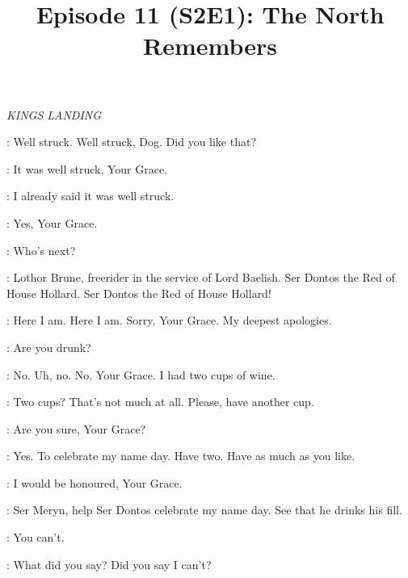 

\title{Episode 11 (S2E1): The North Remembers}
\author{}
\date{}
\maketitle




\scene

\textit{KINGS LANDING}


\JOFFREY: Well struck. Well struck, Dog.  Did you like that?

\SANSA: It was well struck, Your Grace.

\JOFFREY: I already said it was well struck.

\SANSA: Yes, Your Grace.

\JOFFREY: Who's next?

\HERALD: Lothor Brune, freerider in the service of Lord Baelish.  Ser Dontos the Red of House Hollard.  Ser Dontos the Red of House Hollard!


\DONTOS: Here I am. Here I am. Sorry, Your Grace. My deepest apologies.

\JOFFREY: Are you drunk?

\DONTOS: No. Uh, no. No, Your Grace. I had two cups of wine.

\JOFFREY: Two cups? That's not much at all. Please, have another cup.

\DONTOS: Are you sure, Your Grace?

\JOFFREY: Yes. To celebrate my name day. Have two. Have as much as you like.

\DONTOS: I would be honoured, Your Grace.

\JOFFREY: Ser Meryn, help Ser Dontos celebrate my name day. See that he drinks his fill.


\SANSA: You can't.

\JOFFREY: What did you say? Did you say I can't?

